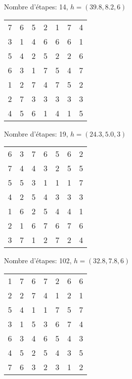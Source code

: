\documentclass[a4paper, 10pt]{article}
\newcommand{\bb}[1]{\colorbox{blue!30}{#1}}
\begin{document}
\begin{figure}[h]
\begin{subfigure}[h]{0.45\textwidth}
\begin{tabular}{|c c c c c c c|}
		\hline
	\end{tabular}
	\caption{Nombre d'étapes: 14, $h = (39.8, 8.2, 6)$}
\end{subfigure}
\begin{subfigure}[h]{0.45\textwidth}
	\centering
	\begin{tabular}{|c c c c c c c|}
		\hline
		\bb{7} & \bb{6} & 5 & \bb{2} & \bb{1} & 7 & 4 \\
		3 & 1 & \bb{4} & 6 & 6 & 6 & 1 \\
		5 & 4 & 2 & 5 & 2 & 2 & 6 \\
		6 & 3 & 1 & 7 & 5 & 4 & 7 \\
		1 & 2 & 7 & 4 & 7 & \bb{5} & 2 \\
		2 & 7 & 3 & 3 & 3 & 3 & \bb{3} \\
		4 & 5 & 6 & 1 & 4 & 1 & 5 \\
		\hline
	\end{tabular}
	\caption{Nombre d'étapes: 19, $h = (24.3, 5.0, 3)$}
\end{subfigure}
\begin{subfigure}[h]{0.45\textwidth}
	\centering
	\begin{tabular}{|c c c c c c c|}
		\hline
		\bb{6} & 3 & \bb{7} & 6 & 5 & 6 & 2 \\
		7 & 4 & 4 & 3 & \bb{2} & 5 & 5 \\
		5 & \bb{5} & 3 & 1 & 1 & \bb{1} & 7 \\
		4 & 2 & 5 & \bb{4} & 3 & 3 & \bb{3} \\
		1 & 6 & 2 & 5 & 4 & 4 & 1 \\
		2 & 1 & 6 & 7 & 6 & 7 & 6 \\
		3 & 7 & 1 & 2 & 7 & 2 & 4 \\
		\hline
	\end{tabular}
	\caption{Nombre d'étapes: 102, $h = (32.8, 7.8, 6)$}
\end{subfigure}
\begin{subfigure}[h]{0.45\textwidth}
	\centering
	\begin{tabular}{|c c c c c c c|}
		\hline
		1 & \bb{7} & \bb{6} & 7 & 2 & 6 & 6 \\
		\bb{2} & 2 & 7 & \bb{4} & \bb{1} & 2 & 1 \\
		5 & 4 & 1 & 1 & 7 & \bb{5} & 7 \\
		3 & 1 & 5 & 3 & 6 & 7 & 4 \\
		6 & 3 & 4 & 6 & 5 & 4 & \bb{3} \\
		4 & 5 & 2 & 5 & 4 & 3 & 5 \\
		7 & 6 & 3 & 2 & 3 & 1 & 2 \\

\end{tabular}
\end{subfigure}
\end{figure}
\end{document}
